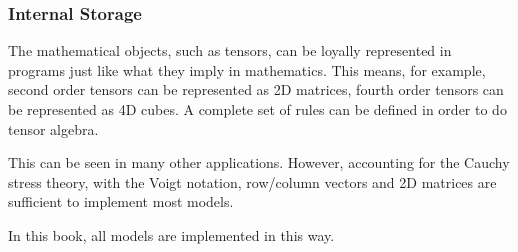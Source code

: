 \subsubsection{Internal Storage}
The mathematical objects, such as tensors, can be loyally represented in programs just like what they imply in mathematics.
This means, for example, second order tensors can be represented as 2D matrices, fourth order tensors can be represented as 4D cubes.
A complete set of rules can be defined in order to do tensor algebra.

This can be seen in many other applications.
However, accounting for the Cauchy stress theory, with the Voigt notation, row/column vectors and 2D matrices are sufficient to implement most models.

In this book, all models are implemented in this way.